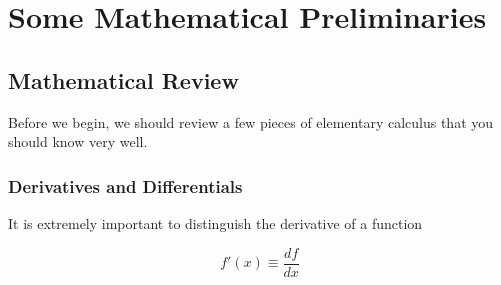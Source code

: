 \chapter{Some Mathematical Preliminaries}

\section{Mathematical Review}
\label{sec:review}

Before we begin, we should review a few pieces of elementary calculus that you should know very well.

\subsection{Derivatives and Differentials}
\label{sec:der_diff}

It is extremely important to distinguish the derivative of a function

\begin{equation}
  \label{eq:derivative}
  f'(x) \equiv \frac{df}{dx}
\end{equation}

